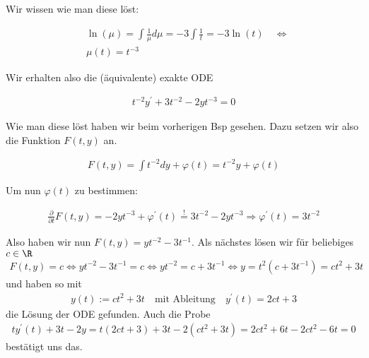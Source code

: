 \begin{solution}
Wir wissen wie man diese löst:

\begin{align*}
  &\ln(\mu) =\int \frac{1}{\mu} d\mu = -3 \int \frac{1}{t} = -3 \ln(t) \quad \Leftrightarrow \\
  &\mu(t) = t^{-3}
\end{align*}

Wir erhalten also die (äquivalente) exakte ODE

\begin{align*}
  t^{-2}y^\prime + 3t^{-2} -2yt^{-3} = 0
\end{align*}

Wie man diese löst haben wir beim vorherigen Bsp gesehen. Dazu setzen wir also die
Funktion $F(t,y)$ an.

\begin{align*}
  F(t,y) = \int t^{-2} dy + \varphi(t) = t^{-2} y + \varphi(t)
\end{align*}

Um nun $\varphi(t)$ zu bestimmen:

\begin{align*}
  \frac{\partial}{\partial t} F(t,y) = -2yt^{-3} + \varphi^\prime (t)
  \stackrel{!}{=} 3t^{-2} -2yt^{-3} \Rightarrow
  \varphi^\prime (t) = 3t^{-2}
\end{align*}

Also haben wir nun $F(t,y) = yt^{-2} - 3t^{-1}$.
Als nächstes lösen wir für beliebiges $c \in \R$
  \begin{align*}
    F(t, y) = c \Leftrightarrow yt^{-2} - 3t^{-1} = c \Leftrightarrow yt^{-2} = c + 3t^{-1} \Leftrightarrow y = t^2 (c + 3t^{-1}) = ct^2 + 3t
  \end{align*}
  und haben so mit
  \begin{align*}
    y(t) := ct^2 + 3t \quad \textrm{mit Ableitung} \quad y^\prime(t) = 2ct + 3
  \end{align*}
  die Lösung der ODE gefunden. Auch die Probe
  \begin{align*}
    ty^\prime(t) + 3t - 2y = t (2ct + 3) + 3t - 2(ct^2 + 3t) = 2ct^2 + 6t - 2ct^2 -6t = 0
  \end{align*}
  bestätigt uns das.
\end{solution}
